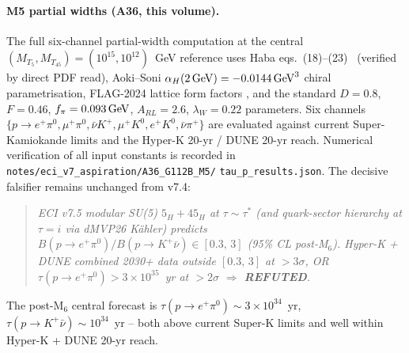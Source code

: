 \documentclass[a4paper,11pt]{article}
\theoremstyle{definition}
\theoremstyle{remark}
\begin{document}
\paragraph{M5 partial widths (A36, this volume).}  The full
six-channel partial-width computation at the central
$(M_{T_5},M_{T_{45}}) = (10^{15},10^{12})$~GeV reference uses
Haba eqs.~(18)--(23)~\cite{HabaNagShim24} (verified by direct PDF
read), Aoki--Soni $\alpha_H(2\,{\rm GeV})=-0.0144\,{\rm GeV}^3$
chiral parametrisation, FLAG-2024 lattice form factors
\cite{FLAG24}, and the standard $D=0.8$, $F=0.46$,
$f_\pi=0.093\,{\rm GeV}$, $A_{RL}=2.6$, $\lambda_W=0.22$
parameters.  Six channels $\{p\to e^+\pi^0,\mu^+\pi^0,
\bar\nu K^+,\mu^+ K^0,e^+ K^0,\bar\nu\pi^+\}$ are evaluated
against current Super-Kamiokande limits
\cite{SuperK20epi,SuperK14Knu} and the Hyper-K 20-yr
\cite{HK18} / DUNE 20-yr \cite{DUNE24} reach.  Numerical
verification of all input constants is recorded in
\texttt{notes/eci\_v7\_aspiration/A36\_G112B\_M5/}
\texttt{tau\_p\_results.json}.  The decisive falsifier remains
unchanged from v7.4:
\begin{quote}\itshape
ECI v7.5 modular SU(5) $5_H+45_H$ at $\tau\sim\tau^{*}$ (and
quark-sector hierarchy at $\tau=i$ via dMVP26 K\"ahler) predicts
$B(p\to e^+\pi^0)/B(p\to K^+\bar\nu)\in[0.3,\,3]$ (95\% CL
post-M$_6$).  Hyper-K + DUNE combined 2030+ data outside
$[0.3,\,3]$ at $>3\sigma$, OR
$\tau(p\to e^+\pi^0)>3\times 10^{35}$~yr at $>2\sigma$
$\Rightarrow$ \textbf{REFUTED}.
\end{quote}
The post-M$_6$ central forecast is
$\tau(p\to e^+\pi^0)\sim 3\times 10^{34}$~yr,
$\tau(p\to K^+\bar\nu)\sim 10^{34}$~yr -- both above current
Super-K limits and well within Hyper-K + DUNE 20-yr reach.
\end{document}
